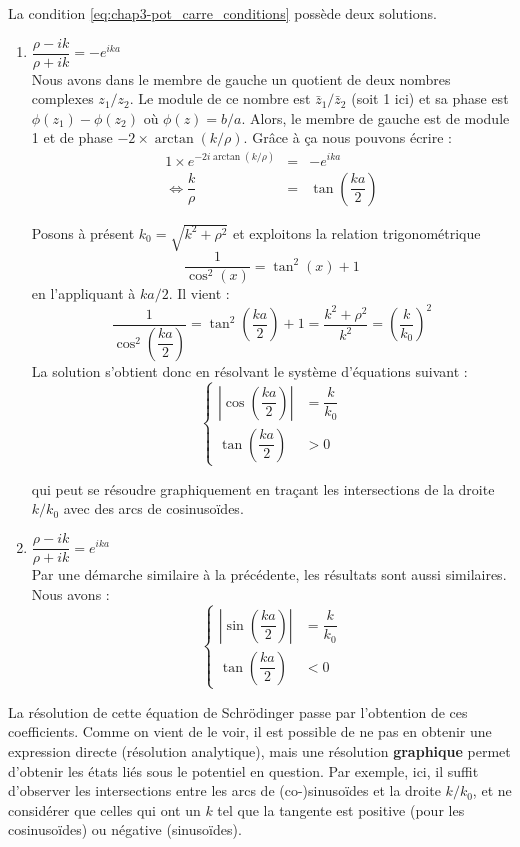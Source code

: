 \documentclass{book}
\begin{document}
  La condition \eqref{eq:chap3-pot_carre_conditions} possède deux solutions.
  \begin{enumerate}%
    \item $\dfrac{\rho - ik}{\rho + ik} = -e^{ika}$ \\
    Nous avons dans le membre de gauche un quotient de deux nombres complexes $z_1/z_2$. Le module de ce nombre est $\bar z_1/\bar z_2$ (soit 1 ici) et sa phase est $\phi(z_1) - \phi(z_2)$ où $\phi(z) = b/a$. Alors, le membre de gauche est de module 1 et de phase $-2\times \arctan(k/\rho)$. Grâce à ça nous pouvons écrire :
    \begin{eqnarray*}
      1\times e^{-2i\arctan(k/\rho)} &=& - e^{ika} \\
      \iff \dfrac{k}{\rho} &=& \tan\left(\dfrac{ka}{2}\right)
    \end{eqnarray*}
    
    Posons à présent $k_0 = \sqrt{k^2 + \rho ^2}$ et exploitons la relation trigonométrique $$\dfrac{1}{\cos ^2(x)} = \tan^2(x) +1$$ en l'appliquant à $ka/2$. Il vient :
    $$\dfrac{1}{\cos ^2\left(\dfrac{ka}{2}\right)} = \tan^2\left(\dfrac{ka}{2}\right) +1  = \dfrac{k^2 + \rho^2}{k^2} = \left(\dfrac{k}{k_0}\right)^2$$
    La solution s'obtient donc en résolvant le système d'équations suivant :
    \begin{equation}
      \left\{ \begin{array}{ll}
        \left| \cos \left(\dfrac{ka}{2}\right)\right| &= \dfrac{k}{k_0} \\
        \tan \left(\dfrac{ka}{2}\right) &>0
      \end{array}\right.
    \end{equation}
    
    qui peut se résoudre graphiquement en traçant les intersections de la droite $k/k_0$ avec des arcs de cosinusoïdes. \\
    \item $\dfrac{\rho - ik}{\rho + ik} = e^{ika}$ \\
    
    Par une démarche similaire à la précédente, les résultats sont aussi similaires. Nous avons :
    \begin{equation}
      \left\{ \begin{array}{ll}
        \left| \sin \left(\dfrac{ka}{2}\right)\right| &= \dfrac{k}{k_0} \\
      \tan \left(\dfrac{ka}{2}\right) &<0
    \end{array}\right.
  \end{equation}
\end{enumerate}
La résolution de cette équation de Schrödinger passe par l'obtention de ces coefficients. Comme on vient de le voir, il est possible de ne pas en obtenir une expression directe (résolution analytique), mais une résolution \textbf{graphique} permet d'obtenir les états liés sous le potentiel en question. Par exemple, ici, il suffit d'observer les intersections entre les arcs de (co-)sinusoïdes et la droite $k/k_0$, et ne considérer que celles qui ont un $k$ tel que la tangente est positive (pour les cosinusoïdes) ou négative (sinusoïdes). 
\end{document}
